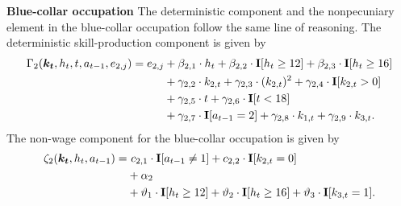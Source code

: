 \noindent\textbf{Blue-collar occupation} The deterministic component and the nonpecuniary element in the blue-collar occupation follow the same line of reasoning. The deterministic skill-production component is given by
%
\begin{align*}
    \Gamma_2(\bm{k_t}, h_t, t, a_{t-1}, e_{2,j}) = e_{2,j} & + \beta_{2,1} \cdot h_t + \beta_{2, 2} \cdot {\textbf{I}}[h_t \geq 12] + \beta_{2,3} \cdot {\textbf{I}}[h_t\geq 16] \\
    							 & + \gamma_{2, 2} \cdot  k_{2,t} + \gamma_{2,3} \cdot  (k_{2,t})^2 + \gamma_{2,4} \cdot  {\textbf{I}}[k_{2,t} > 0] \\
                                   & + \gamma_{2,5} \cdot  t + \gamma_{2,6} \cdot {\textbf{I}}[t < 18] \\
                                  & + \gamma_{2,7} \cdot  {\textbf{I}}[a_{t-1} = 2]  + \gamma_{2,8} \cdot  k_{1,t} + \gamma_{2,9} \cdot  k_{3,t}.
\end{align*}
The non-wage component for the blue-collar occupation is given by
\begin{align*}
\zeta_{2}( \bm{k_t}, h_t, a_{t-1} ) = &~c_{2,1} \cdot {\textbf{I}}[a_{t-1} \neq 1] + c_{2,2} \cdot {\textbf{I}}[k_{2,t} = 0] \\
                            & + \alpha_2 \\
                            & + \vartheta_1 \cdot {\textbf{I}}[h_t \geq 12] + \vartheta_2 \cdot {\textbf{I}}[h_t \geq 16] + \vartheta_3 \cdot {\textbf{I}}[k_{3,t} = 1].
\end{align*}



